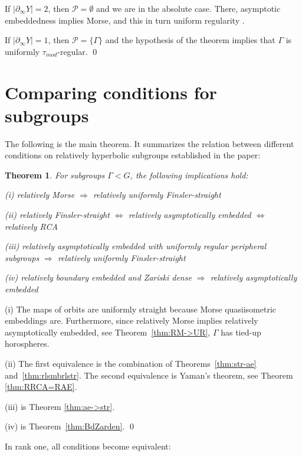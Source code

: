 \documentclass[12pt]{article}
\theoremstyle{boldplain}
\newtheorem{thm}[equation]{Theorem}
\theoremstyle{bolddefinition}
\numberwithin{equation}{section}
\def\Ga{\Gamma}
\def\geo{\partial_{\infty}}
\def\Ra{\Rightarrow}
\def\taumod{\tau_{mod}}
\begin{document}
If $|\geo Y|=2$, then ${\mathcal P}=\emptyset$ and we are in the absolute case.
There, asymptotic embeddedness implies Morse, and this in turn uniform regularity \cite{anolec}.

If $|\geo Y|=1$, then ${\mathcal P}=\{\Ga\}$ 
and the hypothesis of the theorem implies that $\Ga$ is uniformly $\taumod$-regular. 
\qed


\section{Comparing conditions for subgroups}
\label{sec:relation}

The following is the main theorem.
It summarizes the relation between different conditions on relatively hyperbolic subgroups established in the paper:

\begin{thm}\label{thm:main}
For subgroups $\Ga< G$, the following implications hold:

(i) relatively Morse $\Ra$ relatively uniformly Finsler-straight

(ii) relatively Finsler-straight $\Leftrightarrow$ relatively asymptotically embedded $\Leftrightarrow$ relatively RCA

(iii) relatively asymptotically embedded with uniformly regular peripheral subgroups $\Ra$ relatively uniformly Finsler-straight

(iv) relatively boundary embedded and Zariski dense $\Ra$ relatively asymptotically embedded
\end{thm}
\proof 
(i)
The maps of orbits are uniformly straight because Morse quasiisometric embeddings are.
Furthermore, since relatively Morse implies relatively asymptotically embedded, see Theorem~\ref{thm:RM->UR},
$\Ga$ has tied-up horospheres.

(ii) The first equivalence is the combination of Theorems~\ref{thm:str-ae} and~\ref{thm:rlsmbrlstr}.
The second equivalence is Yaman's theorem, see  Theorem \ref{thm:RRCA=RAE}. 

(iii) is Theorem \ref{thm:ae->str}. 

(iv) is Theorem~\ref{thm:BdZarden}. 
\qed

\medskip
In rank one,
all conditions become equivalent:
\end{document}
